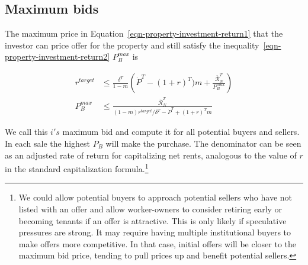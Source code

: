 {{%
% 

\subsection{Maximum bids}
The maximum price in Equation~\ref{eqn-property-investment-return1} that the investor can price offer for the property  and still satisfy the inequality~\ref{eqn-property-investment-return2} $P_B^{max}$ is

\begin{align}
r^{target}& \le \frac{\delta^T}{1-m} \left(\dot P^T - (1+r)^T)m  + \frac{\mathcal{\bar{R}}^T_N}{P_B^{max}}\right)\\
P_B^{max} &\le  \frac{\mathcal{\bar{R}}^T_N}{(1-m)r^{target}/\delta^T - \dot P^T + (1+r)^Tm}
\end{align}

We call this  $i's$ maximum bid and compute it for all potential buyers and sellers. In each sale the highest $P_B$ will make the purchase. The denominator can be seen as an adjusted rate of return for capitalizing net rents, analogous to the value of $r$ in  the standard capitalization formula.\footnote{We could allow potential buyers  to approach potential sellers who have not listed with an offer and allow worker-owners to consider retiring early or becoming tenants if an offer is attractive.  This is only likely if speculative pressures are strong. It may require having multiple institutional buyers to make offers more competitive. In that case, initial offers will be closer to the maximum bid price, tending to pull prices up and benefit potential sellers.}  
}

}
